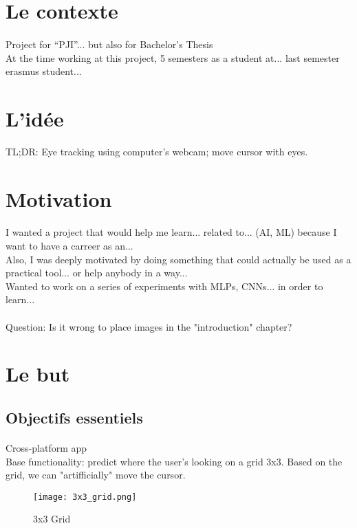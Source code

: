 \section{Le contexte}
\paragraph{}
Project for ``PJI''... but also for Bachelor's Thesis\\
At the time working at this project, 5 semesters as a student at... last semester erasmus student...\\

\section{L'idée}
TL;DR: Eye tracking using computer's webcam; move cursor with eyes.\\

\section{Motivation}
\paragraph{}
I wanted a project that would help me learn... related to... (AI, ML) because I want to have a carreer as an...\\
Also, I was deeply motivated by doing something that could actually be used as a practical tool... or help anybody in a way...\\
Wanted to work on a series of experiments with MLPs, CNNs... in order to learn...\\

\paragraph{}
Question: Is it wrong to place images in the "introduction" chapter?

\section{Le but}

\subsection{Objectifs essentiels}
\paragraph{}
Cross-platform app\\
Base functionality: predict where the user's looking on a grid 3x3. Based on the grid, we can "artifficially" move the cursor.
\begin{figure}[H]
    \centering
    \texttt{[image: 3x3\_grid.png]}
    \caption{3x3 Grid}
    \label{}
\end{figure}
